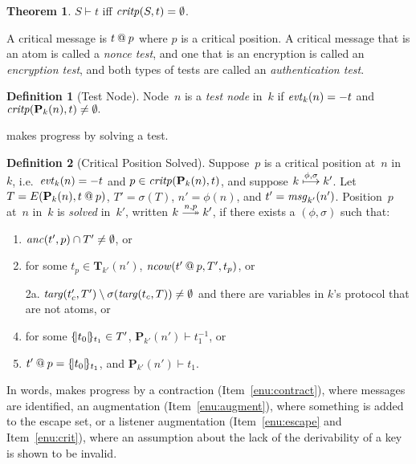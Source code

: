 \documentclass[12pt]{article}
\theoremstyle{definition}
\newtheorem{defn}{Definition}[section]
\newtheorem{thm}{Theorem}[section]
\newcommand{\solve}[1]{\stackrel{#1}{\longtwoheadrightarrow}}
\newcommand{\pubmsg}{\mathbf{P}}
\newcommand{\transpred}{\mathbf{T}}
\newcommand{\critpos}{\fn{critp}}
\newcommand{\anc}{\fn{anc}}
\newcommand{\mncow}{\fn{ncow}}
\newcommand{\evt}{\fn{evt}}
\newcommand{\msg}{\fn{msg}}
\begin{document}
\begin{thm}
$S\vdash t$ iff $\critpos(S,t)=\emptyset$.
\end{thm}

A critical message is $t \mathbin{@} p$ where $p$ is a critical position.
A critical message that is an atom is called a \emph{nonce test}, and
one that is an encryption is called an \emph{encryption test},  and
both types of tests are called an \emph{authentication test}.

\begin{defn}[Test Node]
Node~$n$ is a \emph{test node} in~$k$ if
$\evt_k(n)=\inbnd t$ and $\critpos(\pubmsg_k(n),t)\neq\emptyset.$
\end{defn}

{\cpsa} makes progress by solving a test.

\begin{defn}[Critical Position Solved]\label{def:critical position solved}
Suppose~$p$ is a critical
position at~$n$ in~$k$, i.e.\ $\evt_k(n)=\inbnd t$ and
$p\in\critpos(\pubmsg_k(n),t)$, and suppose
$k\stackrel{\phi,\sigma}{\longmapsto}k'$.  Let $T= E(\pubmsg_k(n),t \termat
p)$, $T'=\sigma(T)$, $n'=\phi(n)$, and $t' = \msg_{k'}(n')$.
Position~$p$ at~$n$ in~$k$ is \emph{solved} in~$k'$, written
$k\solve{n,p}k'$, if there exists a $(\phi,\sigma)$ such that:
\begin{enumerate}
\item\label{enu:contract} $\anc(t',p) \cap T' \neq \emptyset$, or
\item\label{enu:augment} for some $t_p\in\transpred_{k'}(n')$,
$\mncow(t' \termat p,T',t_p)$, or
\item[2a.]\label{enu:augment2}
$\operatorname{\mathit{targ}}(t'_c,T') \setminus
\sigma(\operatorname{\mathit{targ}}(t_c,T)) \neq \emptyset$ and
there are variables in $k$'s protocol that are not atoms, or
\item\label{enu:escape} for some $\{\!|t_0|\!\}_{t_1}\in T'$,
$\pubmsg_{k'}(n')\vdash t_1^{-1}$, or
\item\label{enu:crit} $t' \mathbin{@} p=\{\!|t_0|\!\}_{t_1}$, and
$\pubmsg_{k'}(n')\vdash t_1$.
\end{enumerate}
\end{defn}

In words, {\cpsa} makes progress by a contraction
(Item~\ref{enu:contract}), where messages are identified, an
augmentation (Item~\ref{enu:augment}), where something is added to the
escape set, or a listener augmentation (Item~\ref{enu:escape} and
Item~\ref{enu:crit}), where an assumption about the lack of the
derivability of a key is shown to be invalid.
\end{document}
